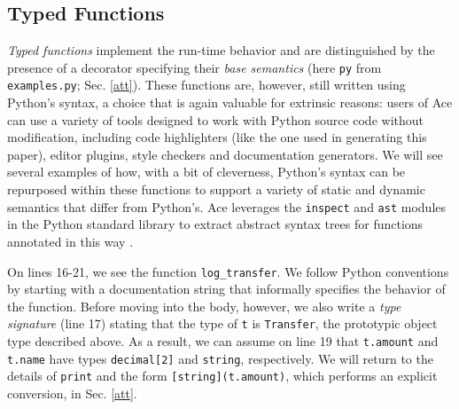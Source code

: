 \documentclass[10pt,preprint]{sigplanconf}
\begin{document}
\subsection{Typed Functions}

\emph{Typed functions} implement the run-time behavior and are distinguished by the presence of a decorator specifying their  \emph{base semantics} (here \verb|py| from \verb|examples.py|; Sec. \ref{att}). These functions are, however, still written using Python's syntax, a choice that is again valuable for extrinsic reasons: users of Ace can use a variety of  tools designed to work with Python source code  without  modification, including code highlighters (like the one used in generating this paper), editor plugins, style checkers and documentation generators. We will see several examples of how, with a bit of cleverness, Python's syntax can be repurposed within these functions to support a variety of static and dynamic semantics that differ from Python's. Ace  leverages the \verb|inspect| and \verb|ast| modules in the Python standard library to extract abstract syntax trees for functions annotated in this way \cite{python}. 

On lines 16-21, we see the function \verb|log_transfer|. We follow Python conventions by starting with a documentation string  that informally specifies the behavior of the function. Before moving into the body, however, we  also write a \emph{type signature} (line 17) stating that the type of \verb|t| is \verb|Transfer|, the prototypic object type described above. As a result, we can assume on line 19 that \verb|t.amount| and \verb|t.name| have types \verb|decimal[2]| and \verb|string|, respectively. We will return to the details of \verb|print| and the form \verb|[string](t.amount)|, which performs an explicit conversion, in Sec. \ref{att}.
\end{document}
